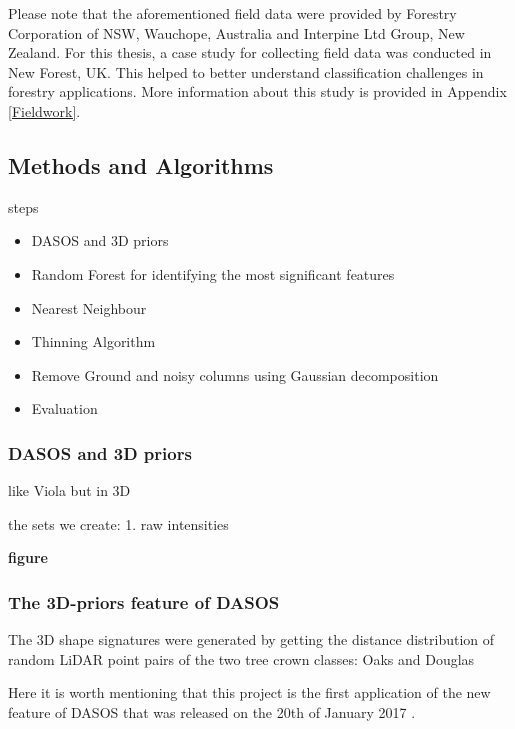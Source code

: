 \documentclass{subfiles}
\begin{document}
\par Please note that the aforementioned field data were provided by Forestry Corporation of NSW, Wauchope, Australia and Interpine Ltd Group, New Zealand. For this thesis, a case study for collecting field data was conducted in New Forest, UK. This helped to better understand classification challenges in forestry applications. More information about this study is provided in Appendix \ref{Fieldwork}.

\subsection{Methods and Algorithms}

\par steps

\begin{itemize}
	\item DASOS and 3D priors
	\item Random Forest for identifying the most significant features
	\item Nearest Neighbour 
	\item Thinning Algorithm
	\item Remove Ground and noisy columns using Gaussian decomposition
	\item Evaluation
\end{itemize}

\subsubsection{DASOS and 3D priors}



\par like Viola but in 3D 

\par the sets we create: 1. raw intensities 

\par \textbf{figure}


\subsubsection{The 3D-priors feature of DASOS}
\par The 3D shape signatures were generated by getting the distance distribution of random LiDAR point pairs of the two tree crown classes: Oaks and Douglas \cite{Dong2009}

\par Here it is worth mentioning that this project is the first application of the new feature of DASOS that was released on the 20th of January 2017 \cite{DASOS_v2}. 
\end{document}
